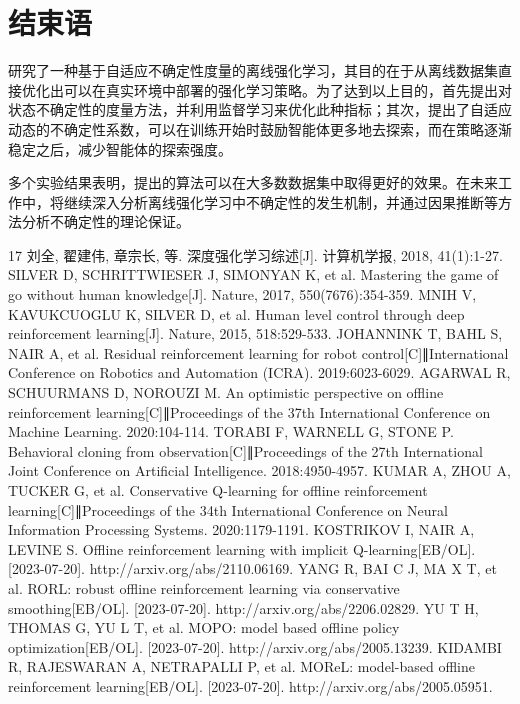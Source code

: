 \documentclass{article}
\begin{document}
\section{结束语}
研究了一种基于自适应不确定性度量的离线强化学习，其目的在于从离线数据集直接优化出可以在真实环境中部署的强化学习策略。为了达到以上目的，首先提出对状态不确定性的度量方法，并利用监督学习来优化此种指标；其次，提出了自适应动态的不确定性系数，可以在训练开始时鼓励智能体更多地去探索，而在策略逐渐稳定之后，减少智能体的探索强度。

多个实验结果表明，提出的算法可以在大多数数据集中取得更好的效果。在未来工作中，将继续深入分析离线强化学习中不确定性的发生机制，并通过因果推断等方法分析不确定性的理论保证。

\begin{thebibliography}{17}
   刘全, 翟建伟, 章宗长, 等. 深度强化学习综述[J]. 计算机学报, 2018, 41(1):1-27.
   SILVER D, SCHRITTWIESER J, SIMONYAN K, et al. Mastering the game of go without human knowledge[J]. Nature, 2017, 550(7676):354-359.
   MNIH V, KAVUKCUOGLU K, SILVER D, et al. Human level control through deep reinforcement learning[J]. Nature, 2015, 518:529-533.
   JOHANNINK T, BAHL S, NAIR A, et al. Residual reinforcement learning for robot control[C]∥International Conference on Robotics and Automation (ICRA). 2019:6023-6029.
   AGARWAL R, SCHUURMANS D, NOROUZI M. An optimistic perspective on offline reinforcement learning[C]∥Proceedings of the 37th International Conference on Machine Learning. 2020:104-114.
   TORABI F, WARNELL G, STONE P. Behavioral cloning from observation[C]∥Proceedings of the 27th International Joint Conference on Artificial Intelligence. 2018:4950-4957.
   KUMAR A, ZHOU A, TUCKER G, et al. Conservative Q-learning for offline reinforcement learning[C]∥Proceedings of the 34th International Conference on Neural Information Processing Systems. 2020:1179-1191.
   KOSTRIKOV I, NAIR A, LEVINE S. Offline reinforcement learning with implicit Q-learning[EB/OL]. [2023-07-20]. http://arxiv.org/abs/2110.06169.
   YANG R, BAI C J, MA X T, et al. RORL: robust offline reinforcement learning via conservative smoothing[EB/OL]. [2023-07-20]. http://arxiv.org/abs/2206.02829.
   YU T H, THOMAS G, YU L T, et al. MOPO: model based offline policy optimization[EB/OL]. [2023-07-20]. http://arxiv.org/abs/2005.13239.
   KIDAMBI R, RAJESWARAN A, NETRAPALLI P, et al. MOReL: model-based offline reinforcement learning[EB/OL]. [2023-07-20]. http://arxiv.org/abs/2005.05951.

\end{thebibliography}
\end{document}
